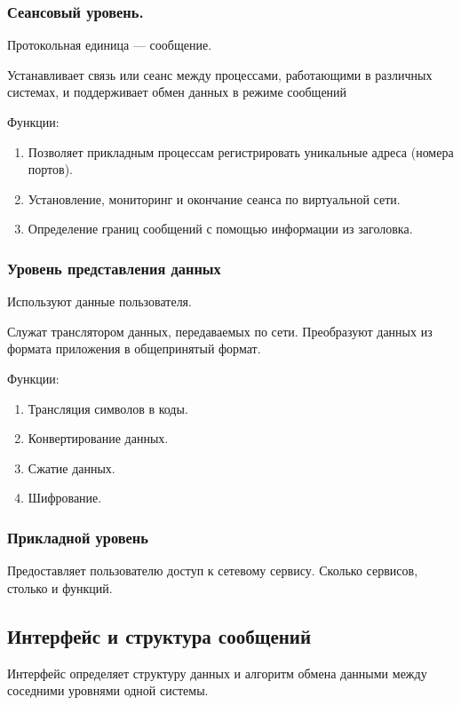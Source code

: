 \documentclass[12pt, russian, oneside, article]{ncc}
\begin{document}
\subsubsection{Сеансовый уровень.}
\label{sec-1_3_5}


Протокольная единица --- сообщение.

Устанавливает связь или сеанс между процессами, работающими в различных системах, и поддерживает обмен данных в режиме сообщений

Функции:
\begin{enumerate}
\item Позволяет прикладным процессам регистрировать уникальные адреса (номера портов).
\item Установление, мониторинг и окончание сеанса по виртуальной сети.
\item Определение границ сообщений с помощью информации из заголовка.
\end{enumerate}
\subsubsection{Уровень представления данных}
\label{sec-1_3_6}


Используют данные пользователя.

Служат транслятором данных, передаваемых по сети. Преобразуют данных из формата приложения в общепринятый формат.

Функции:
\begin{enumerate}
\item Трансляция символов в коды.
\item Конвертирование данных.
\item Сжатие данных.
\item Шифрование.
\end{enumerate}
\subsubsection{Прикладной уровень}
\label{sec-1_3_7}


Предоставляет пользователю доступ к сетевому сервису. Сколько сервисов, столько и функций.
\subsection{Интерфейс и структура сообщений}
\label{sec-1_4}

  
Интерфейс определяет структуру данных и алгоритм обмена данными между соседними уровнями одной системы.
\end{document}
